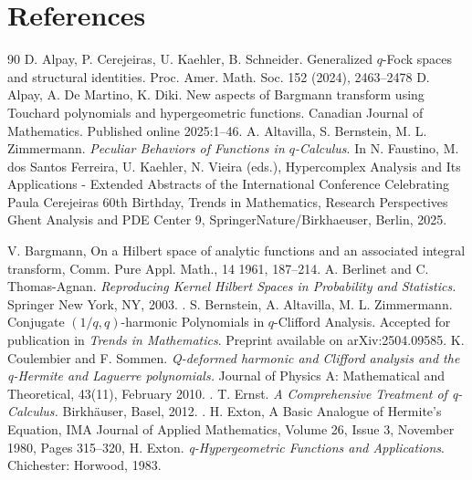 \documentclass[10pt]{amsart}
\theoremstyle{plain}
\theoremstyle{definition}
\begin{document}
\section*{References}
\begin{thebibliography}{90}
D. Alpay, P. Cerejeiras, U. Kaehler, B. Schneider. Generalized $q$-Fock spaces and structural identities. Proc. Amer. Math. Soc. 152 (2024), 2463--2478 
D. Alpay, A. De Martino, K. Diki. New aspects of Bargmann transform using Touchard polynomials and hypergeometric functions. Canadian Journal of Mathematics. Published online 2025:1--46. 
 A. Altavilla, S. Bernstein, M. L. Zimmermann. \textit{Peculiar Behaviors of Functions in $q$-Calculus}. In N. Faustino, M. dos Santos Ferreira, U. Kaehler, N. Vieira (eds.), Hypercomplex Analysis and Its Applications - Extended Abstracts of the International Conference Celebrating Paula Cerejeiras 60th Birthday, Trends in Mathematics, Research Perspectives Ghent Analysis and PDE Center 9, SpringerNature/Birkhaeuser, Berlin, 2025.


  V. Bargmann, On a Hilbert space of analytic functions and an associated integral transform,
Comm. Pure Appl. Math., 14 1961, 187--214. 
 A. Berlinet and C. Thomas-Agnan. \textit{Reproducing Kernel Hilbert Spaces in Probability and Statistics.} Springer New York, NY, 2003. .
 S. Bernstein, A. Altavilla,  M. L. Zimmermann. Conjugate $(1/q, q)$-harmonic Polynomials in $q$-Clifford Analysis. Accepted for publication in \textit{Trends in Mathematics}.
Preprint available on arXiv:2504.09585.
 K. Coulembier and F. Sommen. \textit{Q-deformed harmonic and Clifford analysis and the q-Hermite and Laguerre polynomials.} Journal of Physics A: Mathematical and Theoretical, 43(11), February 2010. .
 T. Ernst. \textit{A Comprehensive Treatment of q-Calculus.} Birkh\"auser, Basel, 2012. .
H. Exton, A Basic Analogue of Hermite's Equation, IMA Journal of Applied Mathematics, Volume 26, Issue 3, November 1980, Pages 315--320, 
 H. Exton. \textit{q-Hypergeometric Functions and Applications}. Chichester: Horwood, 1983.


\end{thebibliography}
\end{document}
